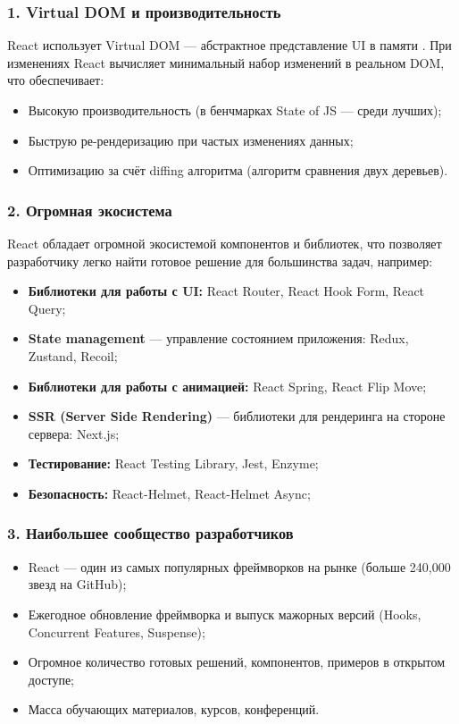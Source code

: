 \subsubsection*{1. Virtual DOM и производительность}
React использует Virtual DOM — абстрактное представление UI в памяти \cite{react-art,indonesian}. При изменениях
React вычисляет минимальный набор изменений в реальном DOM, что обеспечивает:

\begin{itemize}
	\item Высокую производительность (в бенчмарках State of JS — среди лучших);
	\item Быструю ре-рендеризацию при частых изменениях данных;
	\item Оптимизацию за счёт diffing алгоритма (алгоритм сравнения двух деревьев).
\end{itemize}

\subsubsection*{2. Огромная экосистема}
React обладает огромной экосистемой компонентов и библиотек, что позволяет разработчику
легко найти готовое решение для большинства задач, например:

\begin{itemize}
	\item \textbf{Библиотеки для работы с UI:} React Router, React Hook Form, React Query;
	\item \textbf{State management} --- управление состоянием приложения: Redux, Zustand, Recoil;
	\item \textbf{Библиотеки для работы с анимацией:} React Spring, React Flip Move;
	\item \textbf{SSR (Server Side Rendering)} --- библиотеки для рендеринга на стороне сервера: Next.js;
	\item \textbf{Тестирование:} React Testing Library, Jest, Enzyme;
	\item \textbf{Безопасность:} React-Helmet, React-Helmet Async;
\end{itemize}

\subsubsection*{3. Наибольшее сообщество разработчиков}

\begin{itemize}
	\item React --- один из самых популярных фреймворков на рынке (больше 240,000 звезд на GitHub);
	\item Ежегодное обновление фреймворка и выпуск мажорных версий (Hooks, Concurrent Features, Suspense);
	\item Огромное количество готовых решений, компонентов, примеров в открытом доступе;
	\item Масса обучающих материалов, курсов, конференций.
\end{itemize}

